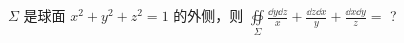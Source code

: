 $\Sigma$ 是球面 $x^2+y^2+z^2=1$ 的外侧，则 $
\displaystyle \oiint\limits_\Sigma
\frac{ \dd{y}\dd{z} }{x} +
\frac{ \dd{z}\dd{x} }{y} +
\frac{ \dd{x}\dd{y} }{z} =
$ ?